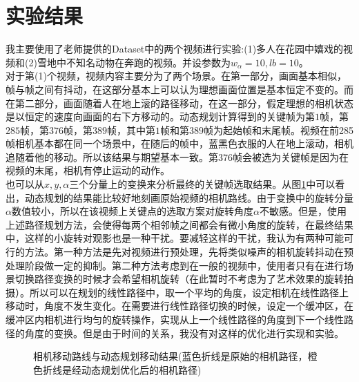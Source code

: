 \documentclass[journal, a4paper]{IEEEtran}
\begin{document}
    
\section{实验结果}
    我主要使用了老师提供的Dataset中的两个视频进行实验:(1)多人在花园中嬉戏的视频和(2)雪地中不知名动物在奔跑的视频。并设参数为$w_\alpha =10,lb=10$。 \\
    
    对于第(1)个视频，视频内容主要分为了两个场景。在第一部分，画面基本相似，帧与帧之间有抖动，在这部分基本上可以认为理想画面位置是基本恒定不变的。而在第二部分，画面随着人在地上滚的路径移动，在这一部分，假定理想的相机状态是以恒定的速度向画面的右下方移动的。动态规划计算得到的关键帧为第$1$帧，第$285$帧，第$376$帧，第$389$帧，其中第$1$帧和第$389$帧为起始帧和末尾帧。视频在前285帧相机基本都在同一个场景中，在随后的帧中，蓝黑色衣服的人在地上滚动，相机追随着他的移动。所以该结果与期望基本一致。第$376$帧会被选为关键帧是因为在视频的末尾，相机有停止运动的动作。\\
    
    也可以从$x,y,\alpha$三个分量上的变换来分析最终的关键帧选取结果。从图\ref{fig:DP_motion_c}中可以看出，动态规划的结果能比较好地刻画原始视频的相机路线。由于变换中的旋转分量$\alpha$数值较小，所以在该视频上关键点的选取方案对旋转角度$\alpha$不敏感。但是，使用上述路径规划方法，会使得每两个相邻帧之间都会有微小角度的旋转，在最终结果中，这样的小旋转对观影也是一种干扰。要减轻这样的干扰，我认为有两种可能可行的方法。第一种方法是先对视频进行预处理，先将类似噪声的相机旋转抖动在预处理阶段做一定的抑制。第二种方法考虑到在一般的视频中，使用者只有在进行场景切换路径变换的时候才会希望相机旋转（在此暂时不考虑为了艺术效果的旋转拍摄）。所以可以在规划的线性路径中，取一个平均的角度，设定相机在线性路径上移动时，角度不发生变化。在需要进行线性路径切换的时候，设定一个缓冲区，在缓冲区内相机进行均匀的旋转操作，实现从上一个线性路径的角度到下一个线性路径的角度的变换。但是由于时间的关系，我没有对这样的优化进行实现和实验。\\
    \begin{figure}[!hbt]
      \begin{center}
          \caption{相机移动路线与动态规划移动结果(蓝色折线是原始的相机路径，橙色折线是经动态规划优化后的相机路径)}
          \label{fig:DP_motion_c}
      \end{center}
    \end{figure}
    
\end{document}
